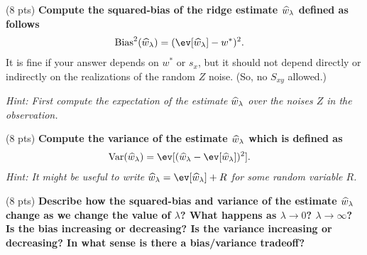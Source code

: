 \documentclass[preview]{standalone}
\begin{document}
\begin{Parts}




\Part (8 pts)
{\bf Compute the squared-bias of the ridge estimate $\widehat{w}_\lambda$ defined as follows}
\begin{align}
    \text{Bias}^2(\whatridge) &= (\ev[\whatridge] - w^*)^2. \label{eq:bias}
    \end{align}
It is fine if your answer depends on $w^*$ or $s_{x}$, but it should
not depend directly or indirectly on the realizations of the random
$Z$ noise. (So, no $S_{xy}$ allowed.)

{\em Hint: First compute the expectation of the estimate $\widehat{w}_\lambda$ over the noises $Z$ in the observation.}






\newpage
\Part (8 pts)
{\bf Compute the variance of the estimate $\widehat{w}_\lambda$ which is defined as}
\begin{align}
        \text{Var}(\whatridge) &= \ev[(\whatridge - \ev[\whatridge])^2]. \label{eq:var}
\end{align}
{\em Hint: It might be useful to write $\whatridge = \ev[\whatridge] + R$ for some random variable $R$.}




\vspace{4in}

\Part (8 pts)  {\bf Describe how the squared-bias and variance of the estimate $\widehat{w}_\lambda$
change as we change the value of $\lambda$? What happens as $\lambda
\rightarrow 0$? $\lambda \rightarrow \infty$? Is the bias increasing
or decreasing? Is the variance increasing or decreasing? In what sense
is there a bias/variance tradeoff?}




































\end{Parts}
\end{document}
